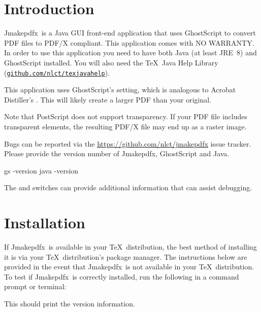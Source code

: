 \documentclass[toc=listof]{scrreport}
\title{\Jmakepdfx}
\author[Nicola L.C. Talbot]{Nicola L.C. Talbot\\\href{https://www.dickimaw-books.com/}{\nolinkurl{dickimaw-books.com}}}
\newcommand{\Jmakepdfx}{Jmakepdfx}
\begin{document}
\maketitle

\frontmatter
\tableofcontents

\mainmatter
\chapter{Introduction}
\label{sec:intro}

\Jmakepdfx\ is a Java \gls{GUI} front-end application that uses GhostScript to convert
PDF files to PDF/X compliant. This application comes with NO
WARRANTY. In order to use this application you need to have both
Java (at least JRE~8) and GhostScript installed. You will also need
the \TeX\ Java Help Library
(\href{https://github.com/nlct/texjavahelp}{\nolinkurl{github.com/nlct/texjavahelp}}). 

This application uses GhostScript's
 setting, which is analogous to Acrobat Distiller's
. This will likely create a larger PDF than
your original.

\begin{warning}
Note that PostScript does not support transparency. If your
PDF file includes transparent elements, the resulting PDF/X file
may end up as a raster image.
\end{warning}

Bugs can be reported via the \url{https://github.com/nlct/jmakepdfx}
issue tracker. Please provide the version number of \Jmakepdfx,
GhostScript and Java.
\begin{terminal}
 
gs -version
java -version
\end{terminal}
The  and  switches can provide
additional information that can assist debugging.

\chapter{Installation}
\label{sec:install}

If \Jmakepdfx\ is available in your \TeX\ distribution, the best
method of installing it is via your \TeX\ distribution's package
manager. The instructions below are provided in the event that 
\Jmakepdfx\ is not available in your \TeX\ distribution.
To test if \Jmakepdfx\ is correctly installed, run the following in
a command prompt or terminal:
\begin{terminal}
 
\end{terminal}
This should print the version information.
\end{document}
